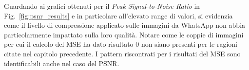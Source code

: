 
\vspace{2em}

Guardando ai grafici ottenuti per il \textit{Peak Signal-to-Noise Ratio} in Fig.~\ref{fig:psnr_results} e in particolare all'elevato range di valori, si evidenzia come il livello di compressione applicato sulle immagini da WhatsApp non abbia particolarmente impattato sulla loro qualità. Notare come le coppie di immagini per cui il calcolo del MSE ha dato risultato 0 non siano presenti per le ragioni citate nel capitolo precedente. I pattern riscontrati per i risultati del MSE sono identificabili anche nel caso del PSNR.\\


